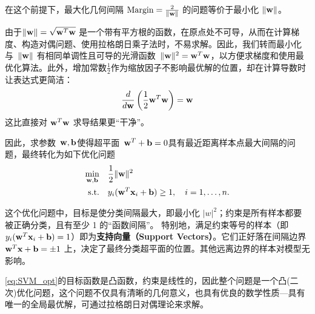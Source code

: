 
在这个前提下，最大化几何间隔 $\text{Margin} = \frac{2}{\|{\bf w}\|}$ 的问题等价于最小化 $\|{\bf w}\|$。

由于$\|{\bf w}\| = \sqrt{{\bf w}^T {\bf w}}$ 是一个带有平方根的函数，在原点处不可导，从而在计算梯度、构造对偶问题、使用拉格朗日乘子法时，不易求解。因此，我们转而最小化与~$\|{\bf w}\|$ 有相同单调性且可导的光滑函数~$ \|{\bf w}\|^2 ={\bf w}^T {\bf w}$，以方便求梯度和使用最优化算法。此外，增加常数$\frac{1}{2}$作为缩放因子不影响最优解的位置，却在计算导数时让表达式更简洁：
$$
\frac{d }{d {\bf w}}\left(\frac{1}{2}{\bf w}^T {\bf w} \right) = {\bf w}
$$
这比直接对 ${\bf w}^T {\bf w}$ 求导结果更“干净”。

因此，求参数~${\bf w},{\bf b}$使得超平面~${\bf w}^T+{\bf b}=0$具有最近距离样本点最大间隔的问题，最终转化为如下优化问题
\begin{equation}\label{eq:SVM_opt}
\begin{aligned}
\min_{{\bf w},{\bf b}} \quad & \frac{1}{2} \|{\bf w}\|^2 \\
\text{s.t.} \quad & y_i({\bf w}^T {\bf x}_i + {\bf b} ) \geq 1, \quad i=1,\dots,n.
\end{aligned}
\end{equation}

这个优化问题中，目标是使分类间隔最大，即最小化 $ |w|^2 $；约束是所有样本都要被正确分类，且有至少 1 的“函数间隔”。
特别地，满足约束等号的样本（即 $y_i({\bf w}^T {\bf x}_i + {\bf b}) = 1$）即为\textbf{支持向量（Support Vectors）}。它们正好落在间隔边界 ${\bf w}^T {\bf x} + {\bf b}= \pm 1$ 上，决定了最终分类超平面的位置。其他远离边界的样本对模型无影响。

\eqref{eq:SVM_opt}的目标函数是凸函数，约束是线性的，因此整个问题是一个凸(二次)优化问题，这个问题不仅具有清晰的几何意义，也具有优良的数学性质---具有唯一的全局最优解，可通过拉格朗日对偶理论来求解。

